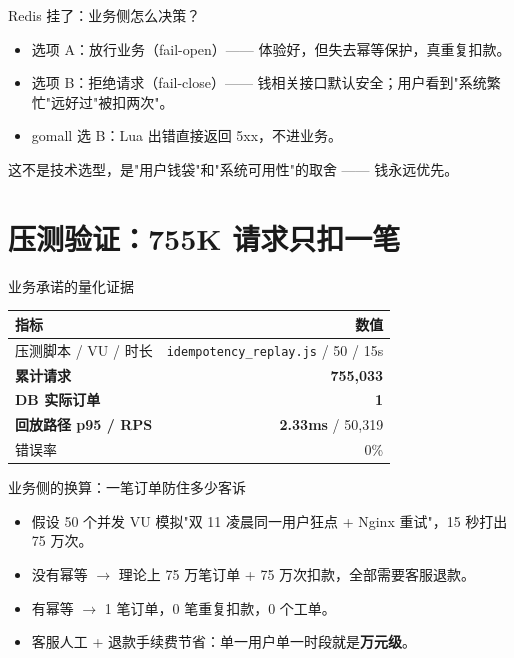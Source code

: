 \begin{frame}{Redis 挂了：业务侧怎么决策？}
\begin{itemize}
  \item 选项 A：放行业务（fail-open）—— 体验好，但失去幂等保护，真重复扣款。
  \item 选项 B：拒绝请求（fail-close）—— 钱相关接口默认安全；用户看到"系统繁忙"远好过"被扣两次"。
  \item gomall 选 B：Lua 出错直接返回 5xx，不进业务。
\end{itemize}
\vspace{2mm}
\small 这不是技术选型，是"用户钱袋"和"系统可用性"的取舍 —— 钱永远优先。
\end{frame}

\section{压测验证：755K 请求只扣一笔}

\begin{frame}{业务承诺的量化证据}
\small
\begin{tabular}{@{}lr@{}}
\toprule
指标 & 数值 \\
\midrule
压测脚本 / VU / 时长 & \texttt{idempotency\_replay.js} / 50 / 15s \\
\textbf{累计请求} & \textbf{755{,}033} \\
\textbf{DB 实际订单} & \textbf{1} \\
\textbf{回放路径 p95 / RPS} & \textbf{2.33ms} / 50{,}319 \\
错误率 & 0\% \\
\bottomrule
\end{tabular}
\vspace{2mm}
\end{frame}

\begin{frame}{业务侧的换算：一笔订单防住多少客诉}
\begin{itemize}
  \item 假设 50 个并发 VU 模拟"双 11 凌晨同一用户狂点 + Nginx 重试"，15 秒打出 75 万次。
  \item 没有幂等 $\to$ 理论上 75 万笔订单 + 75 万次扣款，全部需要客服退款。
  \item 有幂等 $\to$ 1 笔订单，0 笔重复扣款，0 个工单。
  \item 客服人工 + 退款手续费节省：单一用户单一时段就是\textbf{万元级}。
\end{itemize}
\end{frame}

